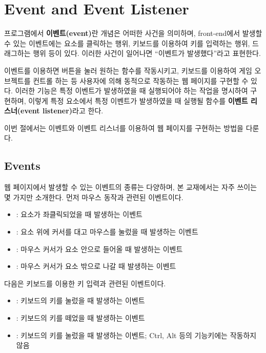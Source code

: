 \section{Event and Event Listener}\label{sect:events}

프로그램에서 \textbf{이벤트(event)}란 개념은 어떠한 사건을 의미하며, front-end에서 발생할 수 있는 이벤트에는 요소를 클릭하는 행위, 키보드를 이용하여 키를 입력하는 행위, 드래그하는 행위 등이 있다. 이러한 사건이 일어나면 ``이벤트가 발생했다''라고 표현한다.

이벤트를 이용하면 버튼을 눌러 원하는 함수를 작동시키고, 키보드를 이용하여 게임 오브젝트를 컨트롤 하는 등 사용자에 의해 동적으로 작동하는 웹 페이지를 구현할 수 있다. 이러한 기능은 특정 이벤트가 발생하였을 때 실행되어야 하는 작업을 명시하여 구현하며, 이렇게 특정 요소에서 특정 이벤트가 발생하였을 때 실행될 함수를 \textbf{이벤트 리스너(event listener)}라고 한다.

이번 절에서는 이벤트와 이벤트 리스너를 이용하여 웹 페이지를 구현하는 방법을 다룬다.

\subsection*{Events}

웹 페이지에서 발생할 수 있는 이벤트의 종류는 다양하며, 본 교재에서는 자주 쓰이는 몇 가지만 소개한다. 먼저 마우스 동작과 관련된 이벤트이다.

\begin{itemize}
    \item {}: 요소가 좌클릭되었을 때 발생하는 이벤트
    \item {}: 요소 위에 커서를 대고 마우스를 눌렀을 때 발생하는 이벤트
    \item {}: 마우스 커서가 요소 안으로 들어올 때 발생하는 이벤트
    \item {}: 마우스 커서가 요소 밖으로 나갈 때 발생하는 이벤트
\end{itemize}

다음은 키보드를 이용한 키 입력과 관련된 이벤트이다.

\begin{itemize}
    \item {}: 키보드의 키를 눌렀을 때 발생하는 이벤트
    \item {}: 키보드의 키를 떼었을 때 발생하는 이벤트
    \item {}: 키보드의 키를 눌렀을 때 발생하는 이벤트; Ctrl, Alt 등의 기능키에는 작동하지 않음
\end{itemize}

